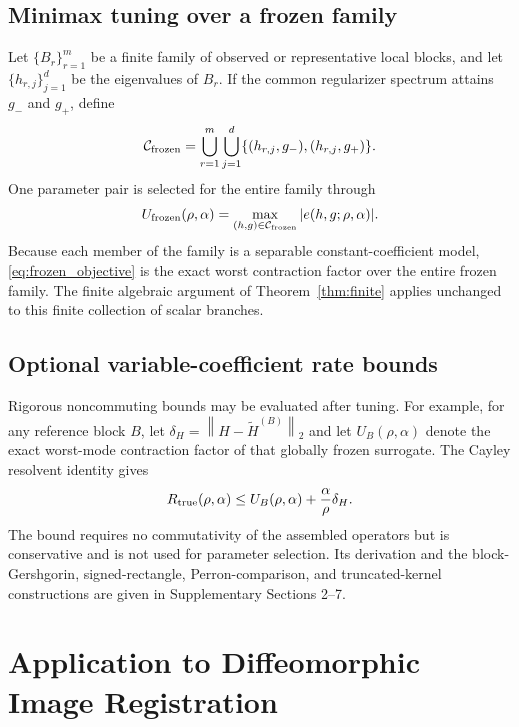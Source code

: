 \documentclass[11pt]{article}
\theoremstyle{definition}
\newcommand{\norm}[1]{\left\lVert #1\right\rVert}
\newcommand{\Ufrozen}{U_{\mathrm{frozen}}}
\begin{document}
\subsection{Minimax tuning over a frozen family}
Let $\{B_r\}_{r=1}^m$ be a finite family of observed or representative local
blocks, and let $\{h_{r,j}\}_{j=1}^d$ be the eigenvalues of $B_r$. If the
common regularizer spectrum attains $g_-$ and $g_+$, define
\[
\mathcal C_{\rm frozen}
=\bigcup_{r=1}^m\bigcup_{j=1}^d
\{(h_{r,j},g_-),(h_{r,j},g_+)\}.
\]
One parameter pair is selected for the entire family through
\begin{equation}
\Ufrozen(\rho,\alpha)=
\max_{(h,g)\in\mathcal C_{\rm frozen}}|e(h,g;\rho,\alpha)|.
\label{eq:frozen_objective}
\end{equation}
Because each member of the family is a separable constant-coefficient model,
\eqref{eq:frozen_objective} is the exact worst contraction factor over the
entire frozen family. The finite algebraic argument of
Theorem~\ref{thm:finite} applies unchanged to this finite collection of scalar
branches.

\subsection{Optional variable-coefficient rate bounds}
Rigorous noncommuting bounds may be evaluated after tuning. For example, for
any reference block $B$, let
$\delta_H=\norm{H-\widetilde H^{(B)}}_2$ and let
$U_B(\rho,\alpha)$ denote the exact worst-mode contraction factor of that
globally frozen surrogate. The Cayley resolvent identity gives
\begin{equation}
R_{\rm true}(\rho,\alpha)
\le U_B(\rho,\alpha)+\frac{\alpha}{\rho}\delta_H.
\label{eq:additive_bound}
\end{equation}
The bound requires no commutativity of the assembled operators but is
conservative and is not used for parameter selection. Its derivation and the
block-Gershgorin, signed-rectangle, Perron-comparison, and truncated-kernel
constructions are given in Supplementary Sections 2--7.

\section{Application to Diffeomorphic Image Registration}\label{sec:registration}
\end{document}
